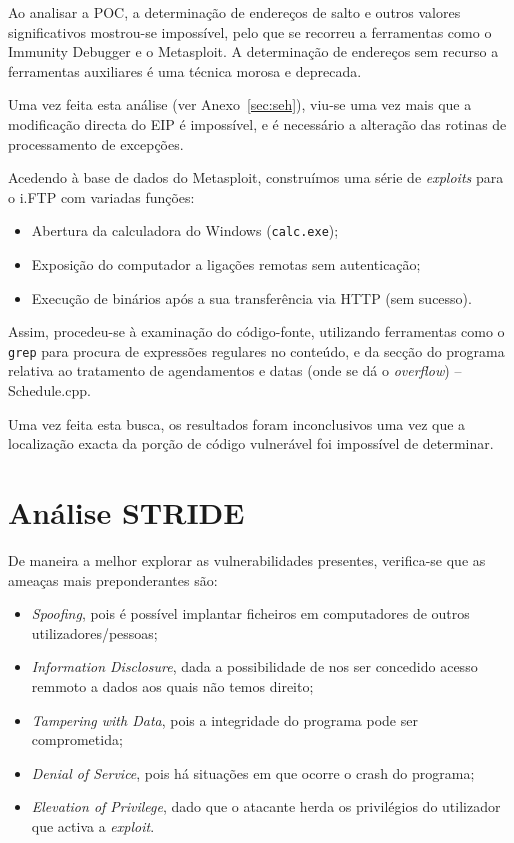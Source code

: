\documentclass[11pt,a4paper]{article}
\begin{document}
Ao analisar a POC, a determinação de endereços de salto e outros valores significativos mostrou-se impossível, pelo que se recorreu a ferramentas como o Immunity Debugger e o Metasploit. A determinação de endereços sem recurso a ferramentas auxiliares é uma técnica morosa e deprecada.

Uma vez feita esta análise (ver Anexo~\ref{sec:seh}), viu-se uma vez mais que a modificação directa do EIP é impossível, e é necessário a alteração das rotinas de processamento de excepções.

Acedendo à base de dados do Metasploit, construímos uma série de \textit{exploits} para o i.FTP com variadas funções:
\begin{itemize}
        \item Abertura da calculadora do Windows (\texttt{calc.exe});
        \item Exposição do computador a ligações remotas sem autenticação;
        \item Execução de binários após a sua transferência via HTTP (sem sucesso).
\end{itemize}

Assim, procedeu-se à examinação do código-fonte, utilizando ferramentas como o \texttt{grep} para procura de expressões regulares no conteúdo, e da secção do programa relativa ao tratamento de agendamentos e datas (onde se dá o \textit{overflow}) -- Schedule.cpp.

Uma vez feita esta busca, os resultados foram inconclusivos uma vez que a localização exacta da porção de código vulnerável foi impossível de determinar.


\pagebreak

\appendix


\section{Análise STRIDE}
\label{sec:stride}

De maneira a melhor explorar as vulnerabilidades presentes, verifica-se que as ameaças mais preponderantes são:

\begin{itemize}
        \item \textit{Spoofing}, pois é possível implantar ficheiros em computadores de outros utilizadores/pessoas;
        \item \textit{Information Disclosure}, dada a possibilidade de nos ser concedido acesso remmoto a dados aos quais não temos direito;
        \item \textit{Tampering with Data}, pois a integridade do programa pode ser comprometida;
        \item \textit{Denial of Service}, pois há situações em que ocorre o crash do programa;
        \item \textit{Elevation of Privilege}, dado que o atacante herda os privilégios do utilizador que activa a \textit{exploit}.
\end{itemize}
\end{document}
